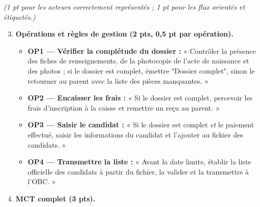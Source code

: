 \documentclass[11pt]{article}
\newcommand{\legende}[1]{\par\vspace{6pt}{\popsemi\fontsize{9}{11.5}\selectfont\color{popmuted}#1}}
\begin{document}
\begin{corrige}
\begin{popfigure}
\legende{MCC du processus d'inscription au BEPC.}
\end{popfigure}
\emph{(1 pt pour les acteurs correctement représentés ; 1 pt pour les flux orientés et étiquetés.)}
\begin{enumerate}
\setcounter{enumi}{2}
\item \textbf{Opérations et règles de gestion (2 pts, 0,5 pt par opération).}
\begin{itemize}
\item \textbf{OP1 — Vérifier la complétude du dossier :} « Contrôler la présence des fiches de renseignements, de la photocopie de l'acte de naissance et des photos ; si le dossier est complet, émettre "Dossier complet", sinon le retourner au parent avec la liste des pièces manquantes. »
\item \textbf{OP2 — Encaisser les frais :} « Si le dossier est complet, percevoir les frais d'inscription à la caisse et remettre un reçu au parent. »
\item \textbf{OP3 — Saisir le candidat :} « Si le dossier est complet \emph{et} le paiement effectué, saisir les informations du candidat et l'ajouter au fichier des candidats. »
\item \textbf{OP4 — Transmettre la liste :} « Avant la date limite, établir la liste officielle des candidats à partir du fichier, la valider et la transmettre à l'OBC. »
\end{itemize}
\item \textbf{MCT complet (3 pts).}
\end{enumerate}
\begin{popfigure}
\begin{center}
\end{center}
\end{popfigure}
\end{corrige}
\end{document}
